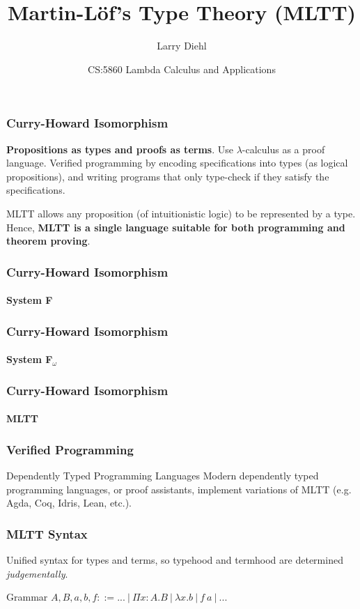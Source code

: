 \documentclass[mathserif]{beamer}
\title{Martin-L{\"o}f's Type Theory (MLTT)}
\author{Larry Diehl}
\institute{University of Iowa - Guest Lecture}
\date[April 26, 2018]
{CS:5860 Lambda Calculus and Applications}
\newcommand{\Funv}[3]{\ensuremath{\Pi #1{:}#2. #3}}
\newcommand{\Fun}[2]{\Funv{x}{#1}{#2}}
\newcommand{\funv}[2]{\ensuremath{\lambda #1. #2}}
\newcommand{\fun}[1]{\funv{x}{#1}}
\newcommand{\app}[2]{\ensuremath{#1~#2}}
\begin{document}
\frame{\titlepage}

\begin{frame}
\frametitle{Curry-Howard Isomorphism}

\textbf{Propositions as types and proofs as terms}.
Use $\lambda$-calculus as a proof language.
Verified programming by encoding specifications
into types (as logical propositions), and
writing programs that only type-check if they
satisfy the specifications.

MLTT allows any proposition (of intuitionistic logic)
to be represented by a type.
Hence, \textbf{MLTT is a single language
suitable for both programming and theorem proving}.

\end{frame}

\begin{frame}
\frametitle{Curry-Howard Isomorphism}
\framesubtitle{System F}


\end{frame}

\begin{frame}
\frametitle{Curry-Howard Isomorphism}
\framesubtitle{System F$_\omega$}


\end{frame}

\begin{frame}
\frametitle{Curry-Howard Isomorphism}
\framesubtitle{MLTT}


\end{frame}

\begin{frame}
\frametitle{Verified Programming}

\begin{block}{Dependently Typed Programming Languages}
Modern dependently typed programming languages, or proof assistants,
implement variations of MLTT (e.g. Agda, Coq, Idris, Lean, etc.).
\end{block}

\end{frame}

\begin{frame}
\frametitle{MLTT Syntax}

Unified syntax for types and terms,
so typehood and termhood are determined \textit{judgementally}.

\begin{block}{Grammar}
$A,B,a,b,f ::= ...~|~\Fun{A}{B}~|~\fun{b}~|~\app{f}{a}~|~...$
\end{block}

\end{frame}
\end{document}
